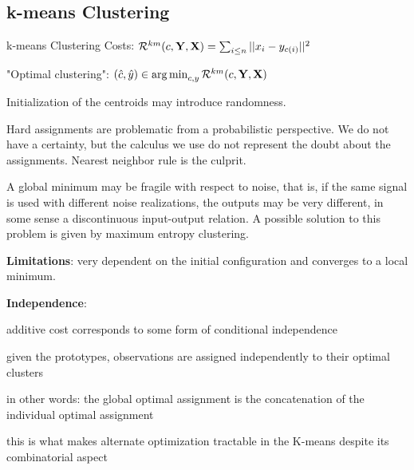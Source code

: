 \documentclass[12pt]{article}
\begin{document}
\subsection{k-means Clustering}
\ulb
\item k-means Clustering Costs: $\mathcal{R}^{km}(c,\mathbf{Y},\mathbf{X}) = \sum_{i \leq n} ||x_i - y_{c(i)}||^2$
\item "Optimal clustering": $(\hat{c},\hat{y}) \in \operatorname*{arg\,min}_{c,y} \mathcal{R}^{km}(c,\mathbf{Y},\mathbf{X})$
\ule
\par Initialization of the centroids may introduce randomness.
\par Hard assignments are problematic from a probabilistic perspective. We do not have a certainty, but the calculus we use do not represent the doubt about the assignments. Nearest neighbor rule is the culprit.
\par A global minimum may be fragile with respect to noise, that is, if the same signal is used with different noise realizations, the outputs may be very different, in some sense a discontinuous input-output relation. A possible solution to this problem is given by maximum entropy clustering.
\par \textbf{Limitations}: very dependent on the initial configuration and converges to a local minimum.
\par \textbf{Independence}:
\ulb
\item additive cost corresponds to some form of conditional
independence
\item given the prototypes, observations are assigned
independently to their optimal clusters
\item in other words: the global optimal assignment is the
concatenation of the individual optimal assignment
\item this is what makes alternate optimization tractable in the
K-means despite its combinatorial aspect
\ule
\end{document}
